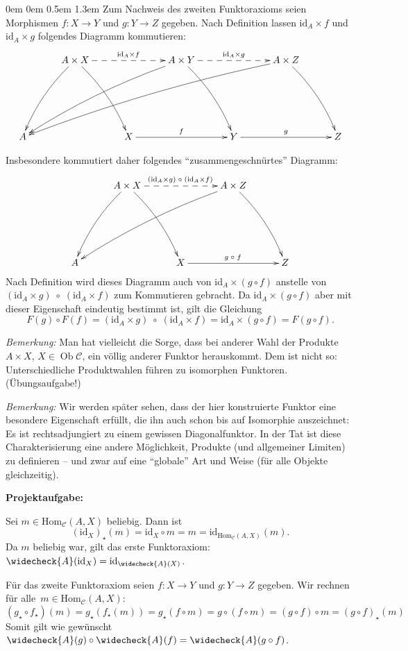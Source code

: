 \documentclass[a4paper,ngerman]{scrartcl}
\theoremstyle{definition}
\theoremstyle{plain}
\theoremstyle{remark}
\newcommand{\C}{\mathcal{C}}
\newcommand{\Hom}{\mathrm{Hom}}
\newcommand{\id}{\mathrm{id}}
\DeclareMathOperator{\Ob}{Ob}
\begin{document}
\begin{list}{}{0em \leftmargin0em \itemindent0.5em \itemsep 1.3em}
Zum Nachweis des zweiten Funktoraxioms seien Morphismen $f:X \to Y$ und $g:Y \to Z$ gegeben. Nach Definition lassen $\id_A \times f$ und $\id_A \times g$ folgendes Diagramm kommutieren:
\[ \xymatrix@=7ex{
  & A \times X \ar@/_/[ldd] \ar@/^/[rdd] \ar@{-->}[rr]^{\id_A \times f} && A \times Y \ar@/_/[llldd] \ar@/^/[rdd] \ar@{-->}[rr]^{\id_A \times g} && A \times Z \ar@/^/[rdd] \ar@/_/[llllldd]\\
  \\
  A && X \ar[rr]^{f} && Y \ar[rr]^{g} && Z
} \]

Insbesondere kommutiert daher folgendes "`zusammengeschnürtes"' Diagramm:
\[ \xymatrix@=7ex{
  & A \times X \ar@/_/[ldd] \ar@/^/[rdd] \ar@{-->}[rr]^{(\id_A \times g)\;\circ\;(\id_A \times f)} && A \times Z \ar@/_/[llldd] \ar@/^/[rdd]\\
  \\
  A && X \ar[rr]^{g\;\circ\;f} && Z
} \]
Nach Definition wird dieses Diagramm auch von $\id_A \times (g \circ f)$ anstelle von $(\id_A \times g)\;\circ\;(\id_A \times f)$ zum Kommutieren gebracht. Da $\id_A \times (g \circ f)$ aber mit dieser Eigenschaft eindeutig bestimmt ist, gilt die Gleichung
\[F(g) \circ F(f) = (\id_A \times g)\;\circ\;(\id_A \times f) = \id_A \times (g \circ f) = F(g \circ f). \]

\emph{Bemerkung:} Man hat vielleicht die Sorge, dass bei anderer Wahl der Produkte~$A \times X$, $X \in \Ob \C$, ein völlig anderer Funktor herauskommt. Dem ist nicht so: Unterschiedliche Produktwahlen führen zu isomorphen Funktoren. (Übungsaufgabe!)

\emph{Bemerkung:} Wir werden später sehen, dass der hier konstruierte Funktor eine besondere Eigenschaft erfüllt, die ihn auch schon bis auf Isomorphie auszeichnet: Es ist rechtsadjungiert zu einem gewissen Diagonalfunktor. In der Tat ist diese Charakterisierung eine andere Möglichkeit, Produkte (und allgemeiner Limiten) zu definieren -- und zwar auf eine "`globale"' Art und Weise (für alle Objekte gleichzeitig).

\item[\textbf{Projektaufgabe:}]\mbox{}

Sei $m \in \Hom_\C(A, X)$ beliebig. Dann ist
\[ (\id_X)_\star(m) = \id_X \circ m = m = \id_{\Hom_\C(A, X)}(m). \]
Da $m$ beliebig war, gilt das erste Funktoraxiom: $\widecheck{A}(\id_X) = \id_{\widecheck{A}(X)}$.

Für das zweite Funktoraxiom seien $f:X \to Y$ und $g:Y \to Z$ gegeben. Wir rechnen für alle~$m \in \Hom_\C(A,X)$:
\[ (g_\star \circ f_\star)(m) = g_\star(f_\star(m)) = g_\star(f \circ m) = g \circ (f \circ m) = (g \circ f) \circ m = (g \circ f)_\star(m)\]
Somit gilt wie gewünscht $\widecheck{A}(g) \circ \widecheck{A}(f) = \widecheck{A}(g \circ f)$.

\end{list}
\end{document}
